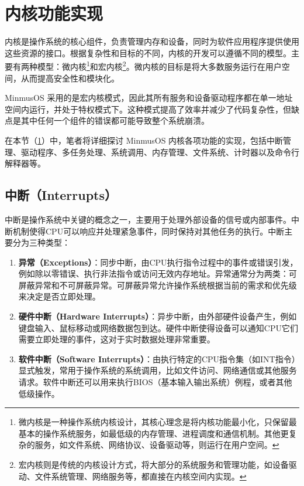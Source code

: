 \section{内核功能实现}\label{sec:KernelFunctionalityImplementation}

内核是操作系统的核心组件，负责管理内存和设备，同时为软件应用程序提供使用这些资源的接口。根据复杂性和目标的不同，内核的开发可以遵循不同的模型。主要有两种模型：微内核\footnote{微内核是一种操作系统内核设计，其核心理念是将内核功能最小化，只保留最基本的操作系统服务，如最低级的内存管理、进程调度和通信机制。其他更复杂的服务，如文件系统、网络协议、设备驱动等，则运行在用户空间。}和宏内核\footnote{宏内核则是传统的内核设计方式，将大部分的系统服务和管理功能，如设备驱动、文件系统管理、网络服务等，都直接在内核空间内实现。}。微内核的目标是将大多数服务运行在用户空间，从而提高安全性和模块化。

MinmusOS 采用的是宏内核模式，因此其所有服务和设备驱动程序都在单一地址空间内运行，并处于特权模式下。这种模式提高了效率并减少了代码复杂性，但缺点是其中任何一个组件的错误都可能导致整个系统崩溃。

在本节（\cref{sec:KernelFunctionalityImplementation}）中，笔者将详细探讨 MinmusOS 内核各项功能的实现，包括中断管理、驱动程序、多任务处理、系统调用、内存管理、文件系统、计时器以及命令行解释器等。

\subsection{中断（Interrupts）}

中断是操作系统中关键的概念之一，主要用于处理外部设备的信号或内部事件。中断机制使得CPU可以响应并处理紧急事件，同时保持对其他任务的执行。中断主要分为三种类型：

\begin{enumerate}
    \item \textbf{异常（Exceptions）}：同步中断，由CPU执行指令过程中的事件或错误引发，例如除以零错误、执行非法指令或访问无效内存地址。异常通常分为两类：可屏蔽异常和不可屏蔽异常。可屏蔽异常允许操作系统根据当前的需求和优先级来决定是否立即处理。
    \item \textbf{硬件中断（Hardware Interrupts）}：异步中断，由外部硬件设备产生，例如键盘输入、鼠标移动或网络数据包到达。硬件中断使得设备可以通知CPU它们需要立即处理的事件，这对于实时数据处理非常重要。
    \item \textbf{软件中断（Software Interrupts）}：由执行特定的CPU指令集（如INT指令）显式触发，常用于操作系统的系统调用，比如文件访问、网络通信或其他服务请求。软件中断还可以用来执行BIOS（基本输入输出系统）例程，或者其他低级操作。
\end{enumerate}

